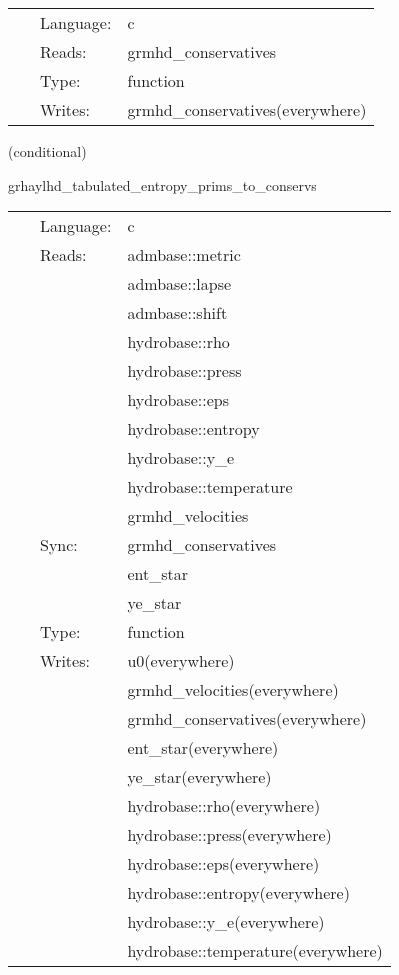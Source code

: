 \hspace{5mm}{\it hybrid version of grhaylhd\_perturb\_conservatives } 


\hspace{5mm}

 \begin{tabular*}{160mm}{cll} 
~ & Language:  & c \\ 
~ & Reads:  & grmhd\_conservatives \\ 
~ & Type:  & function \\ 
~ & Writes:  & grmhd\_conservatives(everywhere) \\ 
\end{tabular*} 


\vspace{5mm}

   (conditional) 

\hspace{5mm} grhaylhd\_tabulated\_entropy\_prims\_to\_conservs 

\hspace{5mm}{\it entropy+tabulated version of grhaylhd\_prims\_to\_conservs } 


\hspace{5mm}

 \begin{tabular*}{160mm}{cll} 
~ & Language:  & c \\ 
~ & Reads:  & admbase::metric \\ 
~& ~ &admbase::lapse\\ 
~& ~ &admbase::shift\\ 
~& ~ &hydrobase::rho\\ 
~& ~ &hydrobase::press\\ 
~& ~ &hydrobase::eps\\ 
~& ~ &hydrobase::entropy\\ 
~& ~ &hydrobase::y\_e\\ 
~& ~ &hydrobase::temperature\\ 
~& ~ &grmhd\_velocities\\ 
~ & Sync:  & grmhd\_conservatives \\ 
~& ~ &ent\_star\\ 
~& ~ &ye\_star\\ 
~ & Type:  & function \\ 
~ & Writes:  & u0(everywhere) \\ 
~& ~ &grmhd\_velocities(everywhere)\\ 
~& ~ &grmhd\_conservatives(everywhere)\\ 
~& ~ &ent\_star(everywhere)\\ 
~& ~ &ye\_star(everywhere)\\ 
~& ~ &hydrobase::rho(everywhere)\\ 
~& ~ &hydrobase::press(everywhere)\\ 
~& ~ &hydrobase::eps(everywhere)\\ 
~& ~ &hydrobase::entropy(everywhere)\\ 
~& ~ &hydrobase::y\_e(everywhere)\\ 
~& ~ &hydrobase::temperature(everywhere)\\ 
\end{tabular*} 


